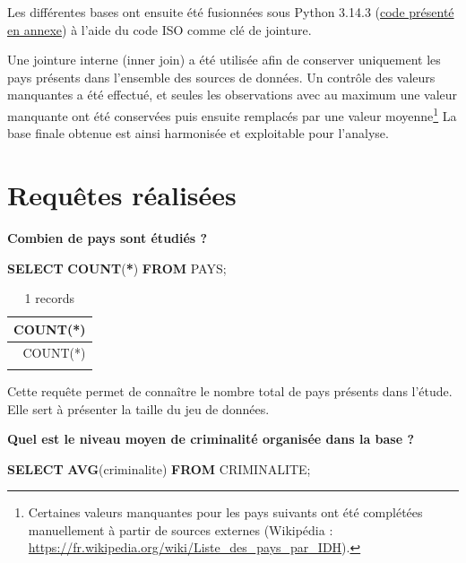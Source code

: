 \documentclass[mstat,12pt]{unswthesis}
\newenvironment{Shaded}{\begin{snugshade}}{\end{snugshade}}
\newcommand{\FunctionTok}[1]{\textcolor[rgb]{0.13,0.29,0.53}{\textbf{#1}}}
\newcommand{\KeywordTok}[1]{\textcolor[rgb]{0.13,0.29,0.53}{\textbf{#1}}}
\newcommand{\NormalTok}[1]{#1}
\newcommand{\OperatorTok}[1]{\textcolor[rgb]{0.81,0.36,0.00}{\textbf{#1}}}
\begin{document}
\medskip

Les différentes bases ont ensuite été fusionnées sous Python 3.14.3
(\hyperref[sec-annexe-3.1--code-python-de-traitement-des-donnuxe9es]{code
présenté en annexe}) à l'aide du code ISO comme clé de jointure.

Une jointure interne (inner join) a été utilisée afin de conserver
uniquement les pays présents dans l'ensemble des sources de données. Un
contrôle des valeurs manquantes a été effectué, et seules les
observations avec au maximum une valeur manquante ont été conservées
puis ensuite remplacés par une valeur
moyenne\footnote{Certaines valeurs manquantes pour les pays suivants ont été complétées manuellement à partir de sources externes (Wikipédia : \url{https://fr.wikipedia.org/wiki/Liste_des_pays_par_IDH}).}
La base finale obtenue est ainsi harmonisée et exploitable pour
l'analyse.

\section{Requêtes réalisées}\label{requuxeates-ruxe9alisuxe9es}

\bigskip

\textbf{Combien de pays sont étudiés ?}

\begin{Shaded}
\begin{Highlighting}[]
\KeywordTok{SELECT} \FunctionTok{COUNT}\NormalTok{(}\OperatorTok{*}\NormalTok{)}
\KeywordTok{FROM}\NormalTok{ PAYS;}
\end{Highlighting}
\end{Shaded}

\begin{longtable}[]{@{}r@{}}
\caption{1 records}\tabularnewline
\toprule\noalign{}
COUNT(*) \\
\midrule\noalign{}
\endfirsthead
\toprule\noalign{}
COUNT(*) \\
\midrule\noalign{}
\endhead
\bottomrule\noalign{}
\endlastfoot
155 \\
\end{longtable}

Cette requête permet de connaître le nombre total de pays présents dans
l'étude. Elle sert à présenter la taille du jeu de données.

\medskip
\medskip

\textbf{Quel est le niveau moyen de criminalité organisée dans la base
?}

\begin{Shaded}
\begin{Highlighting}[]
\KeywordTok{SELECT} \FunctionTok{AVG}\NormalTok{(criminalite)}
\KeywordTok{FROM}\NormalTok{ CRIMINALITE;}
\end{Highlighting}
\end{Shaded}
\end{document}
